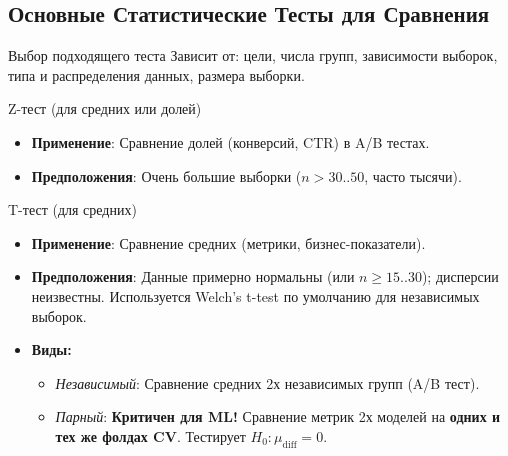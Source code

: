 \subsection{Основные Статистические Тесты для Сравнения}
\begin{myblock}{Выбор подходящего теста}
Зависит от: цели, числа групп, зависимости выборок, типа и распределения данных, размера выборки.
\end{myblock}

\begin{myexampleblock}{{Z-тест (для средних или долей)}}
    \begin{itemize}[nosep, leftmargin=*]
        \item \textbf{Применение}: Сравнение долей (конверсий, CTR) в A/B тестах.
        \item \textbf{Предположения}: Очень большие выборки ($n > 30..50$, часто тысячи).
    \end{itemize}
\end{myexampleblock}

\begin{myexampleblock}{{T-тест (для средних)}}
    \begin{itemize}[nosep, leftmargin=*]
        \item \textbf{Применение}: Сравнение средних (метрики, бизнес-показатели).
        \item \textbf{Предположения}: Данные примерно нормальны (или $n \ge 15..30$); дисперсии неизвестны. Используется Welch's t-test по умолчанию для независимых выборок.
        \item \textbf{Виды:}
            \begin{itemize}
                \item \textit{Независимый}: Сравнение средних 2х независимых групп (A/B тест).
                \item \textit{Парный}: \textbf{Критичен для ML!} Сравнение метрик 2х моделей на \textbf{одних и тех же фолдах CV}. Тестирует $H_0: \mu_{\text{diff}} = 0$.
            \end{itemize}
    \end{itemize}
\end{myexampleblock}

